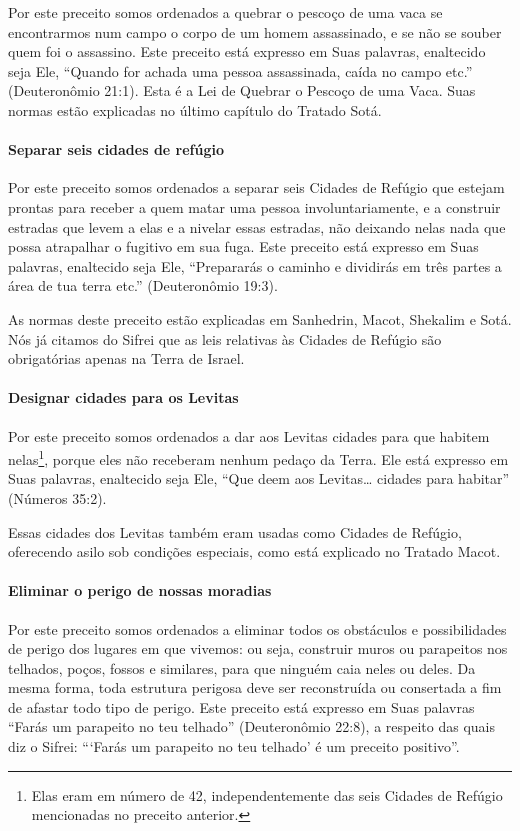 Por este preceito somos ordenados a quebrar o pescoço de uma vaca se
encontrarmos num campo o corpo de um homem assassinado, e se não se
souber quem foi o assassino. Este preceito está expresso em Suas
palavras, enaltecido seja Ele, ``Quando for achada uma pessoa
assassinada, caída no campo etc.'' (Deuteronômio 21:1). Esta é a Lei de
Quebrar o Pescoço de uma Vaca. Suas normas estão explicadas no último
capítulo do Tratado Sotá.

\paragraph{Separar seis cidades de refúgio}

Por este preceito somos ordenados a separar seis Cidades de Refúgio que
estejam prontas para receber a quem matar uma pessoa involuntariamente,
e a construir estradas que levem a elas e a nivelar essas estradas, não
deixando nelas nada que possa atrapalhar o fugitivo em sua fuga. Este
preceito está expresso em Suas palavras, enaltecido seja Ele,
``Prepararás o caminho e dividirás em três partes a área de tua terra
etc.'' (Deuteronômio 19:3).

As normas deste preceito estão explicadas em Sanhedrin, Macot, Shekalim
e Sotá. Nós já citamos do Sifrei que as leis relativas às Cidades de
Refúgio são obrigatórias apenas na Terra de Israel.

\paragraph{Designar cidades para os Levitas}

Por este preceito somos ordenados a dar aos Levitas cidades para que
habitem nelas\footnote{Elas eram em número de 42, independentemente das seis Cidades de
Refúgio mencionadas no preceito anterior.}, porque eles não receberam nenhum
pedaço da Terra. Ele está expresso em Suas palavras, enaltecido seja
Ele, ``Que deem aos Levitas\ldots{} cidades para habitar'' (Números 35:2).

Essas cidades dos Levitas também eram usadas como Cidades de Refúgio,
oferecendo asilo sob condições especiais, como está explicado no Tratado
Macot.

\paragraph{Eliminar o perigo de nossas moradias}

Por este preceito somos ordenados a eliminar todos os obstáculos e
possibilidades de perigo dos lugares em que vivemos: ou seja, construir
muros ou parapeitos nos telhados, poços, fossos e similares, para que
ninguém caia neles ou deles. Da mesma forma, toda estrutura perigosa
deve ser reconstruída ou consertada a fim de afastar todo tipo de
perigo. Este preceito está expresso em Suas palavras ``Farás um
parapeito no teu telhado'' (Deuteronômio 22:8),
a respeito das quais diz o Sifrei: ```Farás um parapeito no teu telhado'
é um preceito positivo''.

